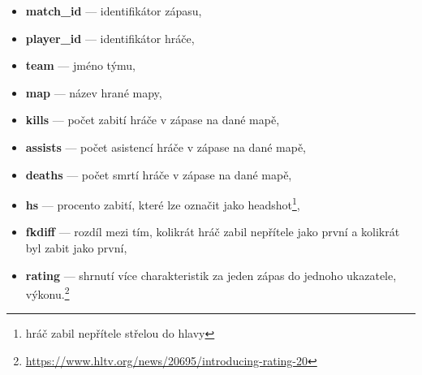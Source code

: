 \begin{itemize}
    \item \textbf{match\_id} --- identifikátor zápasu,
    \item \textbf{player\_id} --- identifikátor hráče,
    \item \textbf{team} --- jméno týmu,
    \item \textbf{map} --- název hrané mapy,
    \item \textbf{kills} --- počet zabití hráče v zápase na dané mapě,
    \item \textbf{assists} --- počet asistencí hráče v zápase na dané mapě,
    \item \textbf{deaths} --- počet smrtí hráče v zápase na dané mapě,
    \item \textbf{hs} --- procento zabití, které lze označit jako headshot\footnote{hráč zabil nepřítele střelou do hlavy},
    \item \textbf{fkdiff} --- rozdíl mezi tím, kolikrát hráč zabil nepřítele jako první a kolikrát byl zabit jako první,
    \item \textbf{rating} --- shrnutí více charakteristik za jeden zápas do jednoho ukazatele, výkonu.\footnote{\url{https://www.hltv.org/news/20695/introducing-rating-20}}
\end{itemize}

